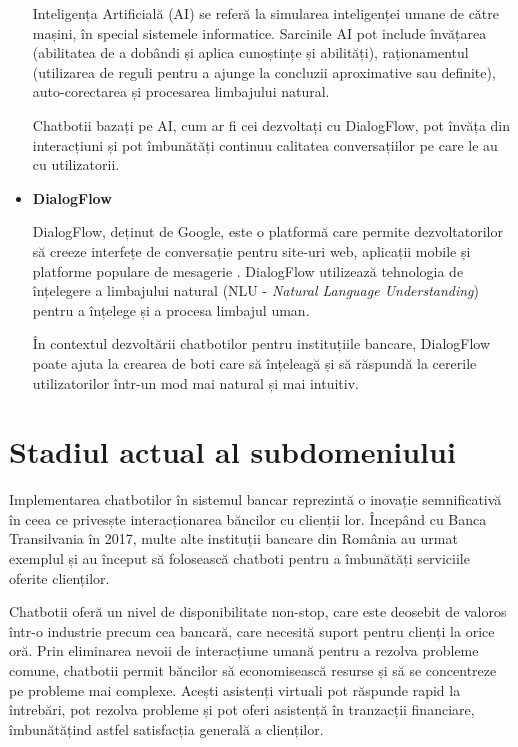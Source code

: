 \begin{itemize}
Inteligența Artificială (AI) se referă la simularea inteligenței umane de către mașini, în special sistemele informatice. Sarcinile AI pot include învățarea (abilitatea de a dobândi și aplica cunoștințe și abilități), raționamentul (utilizarea de reguli pentru a ajunge la concluzii aproximative sau definite), auto-corectarea și procesarea limbajului natural.

Chatbotii bazați pe AI, cum ar fi cei dezvoltați cu DialogFlow, pot învăța din interacțiuni și pot îmbunătăți continuu calitatea conversațiilor pe care le au cu utilizatorii.

    \item \textbf{DialogFlow}

DialogFlow, deținut de Google, este o platformă care permite dezvoltatorilor să creeze interfețe de conversație pentru site-uri web, aplicații mobile și platforme populare de mesagerie \cite{sharma2018}. DialogFlow utilizează tehnologia de înțelegere a limbajului natural (NLU - \emph{Natural Language Understanding}) pentru a înțelege și a procesa limbajul uman.

În contextul dezvoltării chatbotilor pentru instituțiile bancare, DialogFlow poate ajuta la crearea de boti care să înțeleagă și să răspundă la cererile utilizatorilor într-un mod mai natural și mai intuitiv.

\end{itemize}

\section{Stadiul actual al subdomeniului}

Implementarea chatbotilor în sistemul bancar reprezintă o inovație semnificativă în ceea ce privesște interacționarea băncilor cu clienții lor. Începând cu Banca Transilvania în 2017, multe alte instituții bancare din România au urmat exemplul și au început să folosească chatboti pentru a îmbunătăți serviciile oferite clienților.

Chatbotii oferă un nivel de disponibilitate non-stop, care este deosebit de valoros într-o industrie precum cea bancară, care necesită suport pentru clienți la orice oră. Prin eliminarea nevoii de interacțiune umană pentru a rezolva probleme comune, chatbotii permit băncilor să economisească resurse și să se concentreze pe probleme mai complexe. Acești asistenți virtuali pot răspunde rapid la întrebări, pot rezolva probleme și pot oferi asistență în tranzacții financiare, îmbunătățind astfel satisfacția generală a clienților.

